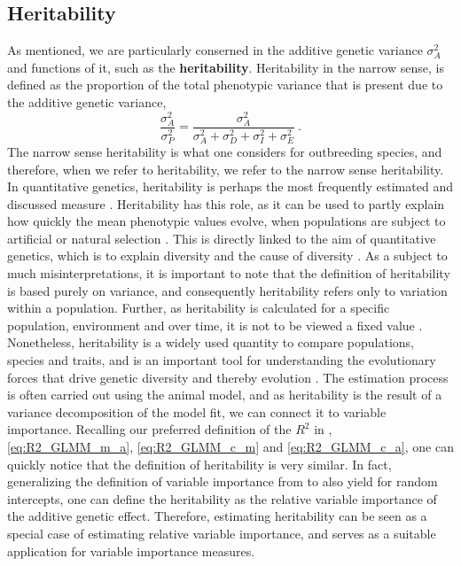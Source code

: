 \subsection*{Heritability}
As mentioned, we are particularly conserned in the additive genetic variance $\sigma^2_A$ and functions of it, such as the \textbf{heritability}.
Heritability in the narrow sense, is defined as \citep{Wilson2008} the proportion of the total phenotypic variance that is present due to the additive genetic variance, 
\begin{equation}
    \label{eq:h2}
    \frac{\sigma^2_A}{\sigma^2_P} = \frac{\sigma^2_A}{\sigma^2_A + \sigma^2_D + \sigma^2_I + \sigma^2_E} \ .
\end{equation}
The narrow sense heritability is what one considers for outbreeding species, and therefore, when we refer to heritability, we refer to the narrow sense heritability.
In quantitative genetics, heritability is perhaps the most frequently estimated and discussed measure \citep{ConnerHartl2004}. Heritability has this role, as it can be used to partly explain how quickly the mean phenotypic values evolve, when populations are subject to artificial or natural selection \citep{ConnerHartl2004}. This is directly linked to the aim of quantitative genetics, which is to explain diversity and the cause of diversity \citep{Kruuk2004}. As a subject to much misinterpretations, it is important to note that the definition of heritability is based purely on variance, and consequently heritability refers only to variation within a population. Further, as heritability is calculated for a specific population, environment and over time, it is not to be viewed a fixed value \citep{ConnerHartl2004}. Nonetheless, heritability is a widely used quantity to compare populations, species and traits, and is an important tool for understanding the evolutionary forces that drive genetic diversity and thereby evolution \citep{ConnerHartl2004}. The estimation process is often carried out using the animal model, and as heritability is the result of a variance decomposition of the model fit, we can connect it to variable importance.
Recalling our preferred definition of the $R^2$ in , \eqref{eq:R2_GLMM_m_a}, \eqref{eq:R2_GLMM_c_m} and \eqref{eq:R2_GLMM_c_a}, one can quickly notice that the definition of heritability is very similar. In fact, generalizing the definition of variable importance from\citet{gromping_relaimpo} to also yield for random intercepts, one can define the heritability as the relative variable importance of the additive genetic effect. Therefore, estimating heritability can be seen as a special case of estimating relative variable importance, and serves as a suitable application for variable importance measures.
